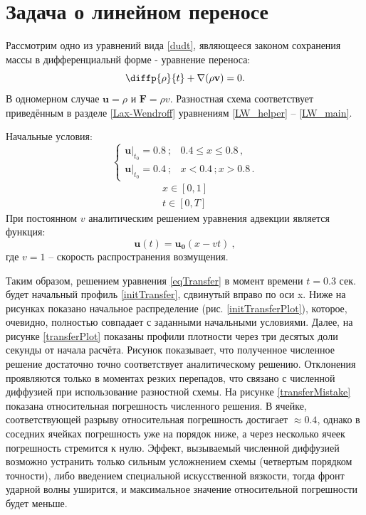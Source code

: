 \documentclass[a4paper]{article}
\begin{document}
	\section{Задача о линейном переносе}\label{transfer}
	Рассмотрим одно из уравнений вида \eqref{dudt}, являющееся законом сохранения массы в дифференциальнй форме - уравнение переноса:
	\begin{equation}\label{eqTransfer}
		\diffp{\rho}{t} + \nabla ( \rho \mathbf{v} ) = 0 .
	\end{equation}
	В одномерном случае $\mathbf{u} = \rho$ и $\mathbf{F} = \rho v$. Разностная схема соответствует приведённым в разделе \ref{Lax-Wendroff} уравнениям \eqref{LW_helper} -- \eqref{LW_main}.
	
	Начальные условия:
	\begin{equation}\label{initTransfer}
		\begin{cases}
			\left.\mathbf{u}\right|_{t_0} = 0.8\:;		&		0.4 \leqslant x \leqslant 0.8 \, ,	\\
			\left.\mathbf{u}\right|_{t_0} = 0.4\:;		&		x < 0.4\,; x > 0.8 \, .
		\end{cases}
	\end{equation}
	\[
		\begin{aligned}
			x \in [0, 1] \\
			t \in [0, T]
		\end{aligned}
	\]
	При постоянном $v$ аналитическим решением уравнения адвекции является функция:
	\begin{equation}
		\mathbf{u}(t) = \mathbf{u_0}(x - vt) \: ,
	\end{equation}
	где $v = 1$ -- скорость распространения возмущения. 
	
	Таким образом, решением уравнения \eqref{eqTransfer} в момент времени $t = 0.3$ сек. будет начальный профиль \eqref{initTransfer}, сдвинутый вправо по оси x. 
	Ниже на рисунках показано начальное распределение (рис. \ref{initTransferPlot}), которое, очевидно, полностью совпадает с заданными начальными условиями. 
	Далее, на рисунке \ref{transferPlot} показаны профили плотности через три десятых доли секунды от начала расчёта. Рисунок показывает, что полученное численное решение достаточно точно соответствует аналитическому решению. Отклонения проявляются только в моментах резких перепадов, что связано с численной диффузией при использование разностной схемы. На рисунке \eqref{transferMistake} показана относительная погрешность численного решения. В ячейке, соответствующей разрыву относительная погрешность достигает $\approx 0.4$, однако в соседних ячейках погрешность уже на порядок ниже, а через несколько ячеек погрешность стремится к нулю. Эффект, вызываемый численной диффузией возможно устранить только сильным усложнением схемы (четвертым порядком точности), либо введением специальной искусственной вязкости, тогда фронт ударной волны уширится, и максимальное значение относительной погрешности будет меньше. 
	
\end{document}
